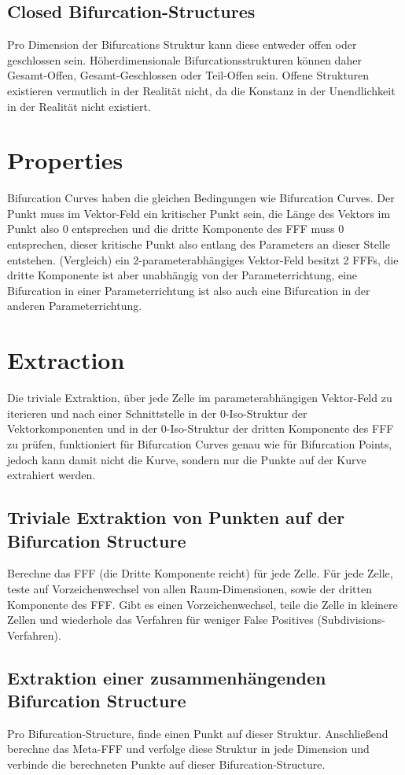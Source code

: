 \documentclass[11pt]{article}
\begin{document}
\subsection{Closed Bifurcation-Structures}
Pro Dimension der Bifurcations Struktur kann diese entweder offen oder geschlossen sein.
Höherdimensionale Bifurcationsstrukturen können daher Gesamt-Offen, Gesamt-Geschlossen oder Teil-Offen sein.
Offene Strukturen existieren vermutlich in der Realität nicht, da die Konstanz in der Unendlichkeit in der Realität nicht existiert.

\section{Properties}
Bifurcation Curves haben die gleichen Bedingungen wie Bifurcation Curves. Der Punkt muss im Vektor-Feld ein kritischer Punkt sein, die Länge des Vektors im Punkt also 0 entsprechen und die dritte Komponente des FFF muss 0 entsprechen, dieser kritische Punkt also entlang des Parameters an dieser Stelle entstehen.
(Vergleich) ein 2-parameterabhängiges Vektor-Feld besitzt 2 FFFs, die dritte Komponente ist aber unabhängig von der Parameterrichtung, eine Bifurcation in einer Parameterrichtung ist also auch eine Bifurcation in der anderen Parameterrichtung.

\section{Extraction}
Die triviale Extraktion, über jede Zelle im parameterabhängigen Vektor-Feld zu iterieren und nach einer Schnittstelle in der 0-Iso-Struktur der Vektorkomponenten und in der 0-Iso-Struktur der dritten Komponente des FFF zu prüfen, funktioniert für Bifurcation Curves genau wie für Bifurcation Points, jedoch kann damit nicht die Kurve, sondern nur die Punkte auf der Kurve extrahiert werden.

\subsection{Triviale Extraktion von Punkten auf der Bifurcation Structure}
Berechne das FFF (die Dritte Komponente reicht) für jede Zelle.
Für jede Zelle, teste auf Vorzeichenwechsel von allen Raum-Dimensionen, sowie der dritten Komponente des FFF. Gibt es einen Vorzeichenwechsel, teile die Zelle in kleinere Zellen und wiederhole das Verfahren für weniger False Positives (Subdivisions-Verfahren).
\subsection{Extraktion einer zusammenhängenden Bifurcation Structure}
Pro Bifurcation-Structure, finde einen Punkt auf dieser Struktur. Anschließend berechne das Meta-FFF und verfolge diese Struktur in jede Dimension und verbinde die berechneten Punkte auf dieser Bifurcation-Structure.
\end{document}
